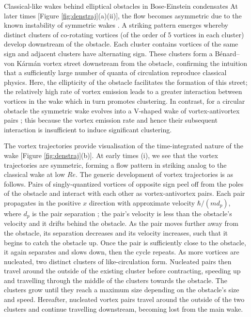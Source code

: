 \begin{chapter}{\label{cha:wake}Classical-like wakes behind elliptical obstacles in Bose-Einstein condensates}
At later times [Figure \ref{fig:denstraj}(a)(ii)], the flow becomes asymmetric due to the known instability of symmetric wakes \cite{nore93}.  A striking pattern emerges whereby distinct clusters of co-rotating vortices (of the order of 5 vortices in each cluster) develop downstream of the obstacle.  Each cluster contains vortices of the same sign and adjacent clusters have alternating sign.  These clusters form a B\'enard--von K\'arm\'an vortex street downstream from the obstacle, confirming the intuition that a sufficiently large number of quanta of circulation reproduce classical physics.  Here, the ellipticity of the obstacle facilitates the formation of this street; the relatively high rate of vortex emission leads to a greater interaction between vortices in the wake which in turn promotes clustering.  In contrast, for a circular obstacle the symmetric wake evolves into a V-shaped wake of vortex-antivortex pairs \cite{saito10}; this because the vortex emission rate and hence their subsequent interaction is insufficient to induce significant clustering.  


The vortex trajectories provide visualisation of the time-integrated nature of the wake  [Figure \ref{fig:denstraj}(b)].   At early times (i), we see that the vortex trajectories are symmetric, forming a flow pattern in striking analog to the classical wake at low $Re$.  The generic development of vortex trajectories is as follows.  Pairs of singly-quantized vortices of opposite sign peel off from the poles of the obstacle and interact with each other as vortex-antivortex pairs.  Each pair propagates in the positive $x$ direction with approximate velocity $\hbar/(md_p)$\cite{saito10}, where $d_p$ is the pair separation \cite{Donnelly};  the pair's velocity is less than the obstacle's velocity and it drifts behind the obstacle.  As the pair moves further away from the obstacle, its separation decreases and its velocity increases, such that it begins to catch the obstacle up.  Once the pair is sufficiently close to the obstacle, it again separates and slows down, then the cycle repeats.  As more vortices are nucleated, two distinct clusters of like-circulation form.  Nucleated pairs then travel around the outside of the existing cluster before contracting, speeding up and travelling through the middle of the clusters towards the obstacle.  The clusters grow until they reach a maximum size depending on the obstacle's size and speed.  Hereafter, nucleated vortex pairs travel around the outside of the two clusters and continue travelling downstream,  becoming lost from the main wake. 
 

\end{chapter}

